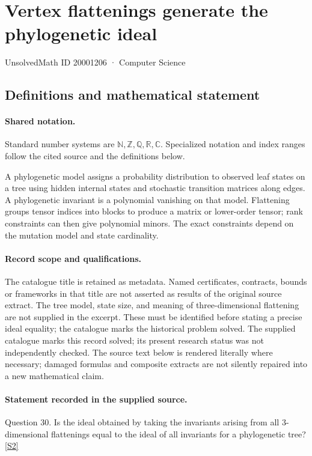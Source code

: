 \documentclass[11pt]{article}
\newcommand{\sref}[2]{\hyperlink{source:#1:#2}{[S#2]}}
\begin{document}
\setcounter{section}{20001205}
\section{Vertex flattenings generate the phylogenetic ideal}\label{20001206}
{\small\sffamily UnsolvedMath ID 20001206 · Computer Science}
\subsection{Definitions and mathematical statement}

\paragraph{Shared notation.}Standard number systems are $\mathbb N,\mathbb Z,\mathbb Q,\mathbb R,\mathbb C$. Specialized notation and index ranges follow the cited source and the definitions below.


A phylogenetic model assigns a probability distribution to observed leaf states on a tree using hidden internal states and stochastic transition matrices along edges. A phylogenetic invariant is a polynomial vanishing on that model. Flattening groups tensor indices into blocks to produce a matrix or lower-order tensor; rank constraints can then give polynomial minors. The exact constraints depend on the mutation model and state cardinality.
\paragraph{Record scope and qualifications.}
The catalogue title is retained as metadata. Named certificates, contracts, bounds or frameworks in that title are not asserted as results of the original source extract.
The tree model, state size, and meaning of three-dimensional flattening are not supplied in the excerpt. These must be identified before stating a precise ideal equality; the catalogue marks the historical problem solved. The supplied catalogue marks this record solved; its present research status was not independently checked.
The source text below is rendered literally where necessary; damaged formulas and composite extracts are not silently repaired into a new mathematical claim.
\paragraph{Statement recorded in the supplied source.}
Question 30. Is the ideal obtained by taking the invariants arising from all 3-dimensional flattenings equal to the ideal of all invariants for a phylogenetic tree? \sref{20001206}{2}
\end{document}
